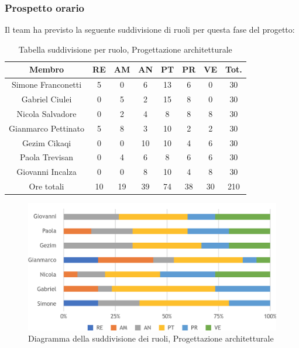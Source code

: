 \subsubsection{Prospetto orario}
Il team ha previsto la seguente suddivisione di ruoli per questa fase del progetto:
\\
\begin{table}[h]
\caption{Tabella suddivisione per ruolo, Progettazione architetturale}  
\begin{center}
\begin{tabular}{ |c|c|c|c|c|c|c|c|  }
 \hline
 Membro 		& RE 	& AM 	& AN 	& PT 	& PR 	& VE 	& Tot.\\
 \hline\hline
 Simone	Franconetti		& 5 		& 0		& 6 	& 13 	& 6 		& 0 		& 30\\
 Gabriel Ciulei		& 0 		& 5 		& 2 	& 15		& 8 		& 0 		& 30\\
 Nicola	Salvadore		& 0 		& 2 		& 4 	& 8		& 8 		& 8 		& 30\\
 Gianmarco	Pettinato	& 5 		& 8 		& 3 	& 10 	& 2 		& 2 		& 30\\
 Gezim	Cikaqi		& 0 		& 0 		& 10 	& 10		& 4 		& 6	 	& 30\\
 Paola	Trevisan		& 0 		& 4 		& 6 	& 8 		& 6 		& 6 		& 30\\
 Giovanni Incalza		& 0 		& 0	 	& 8 	& 10		& 4 		& 8  	& 30\\
 \hline\hline
 Ore totali		& 10		& 19		& 39 	& 74	 	& 38 	& 30 	& 210\\
  \hline
\end{tabular}
\end{center}
\end{table}
\begin{figure}[h!]
	\includegraphics[width=\textwidth]{res/img/hi336}
	\caption{Diagramma della suddivisione dei ruoli, Progettazione architetturale}
\end{figure}

